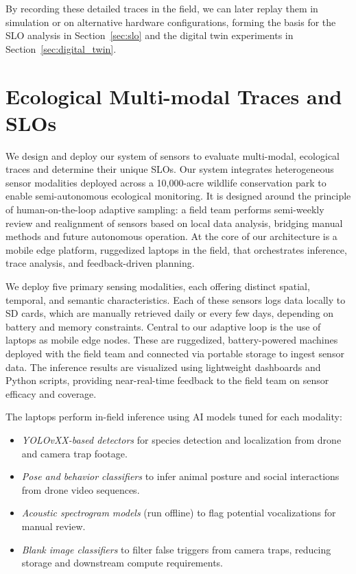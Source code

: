 \documentclass[letterpaper,twocolumn,10pt]{article}
\begin{document}
By recording these detailed traces in the field, we can later replay them in simulation or on alternative hardware configurations, forming the basis for the SLO analysis in Section~\ref{sec:slo} and the digital twin experiments in Section~\ref{sec:digital_twin}.


\section{Ecological Multi-modal Traces and SLOs}

We design and deploy our system of sensors to evaluate multi-modal, ecological traces and determine their unique SLOs.
Our system integrates heterogeneous sensor modalities deployed across a 10,000-acre wildlife conservation park to enable semi-autonomous ecological monitoring. It is designed around the principle of human-on-the-loop adaptive sampling: a field team performs semi-weekly review and realignment of sensors based on local data analysis, bridging manual methods and future autonomous operation. At the core of our architecture is a mobile edge platform, ruggedized laptops in the field, that orchestrates inference, trace analysis, and feedback-driven planning.



We deploy five primary sensing modalities, each offering distinct spatial, temporal, and semantic characteristics. Each of these sensors logs data locally to SD cards, which are manually retrieved daily or every few days, depending on battery and memory constraints. Central to our adaptive loop is the use of laptops as mobile edge nodes. These are ruggedized, battery-powered machines deployed with the field team and connected via portable storage to ingest sensor data. The inference results are visualized using lightweight dashboards and Python scripts, providing near-real-time feedback to the field team on sensor efficacy and coverage.


The laptops perform in-field inference using AI models tuned for each modality:
\begin{itemize}
    \item \textit{YOLOvXX-based detectors} for species detection and localization from drone and camera trap footage.
    \item \textit{Pose and behavior classifiers} to infer animal posture and social interactions from drone video sequences.
    \item \textit{Acoustic spectrogram models} (run offline) to flag potential vocalizations for manual review.
    \item \textit{Blank image classifiers} to filter false triggers from camera traps, reducing storage and downstream compute requirements.
\end{itemize}
\end{document}
